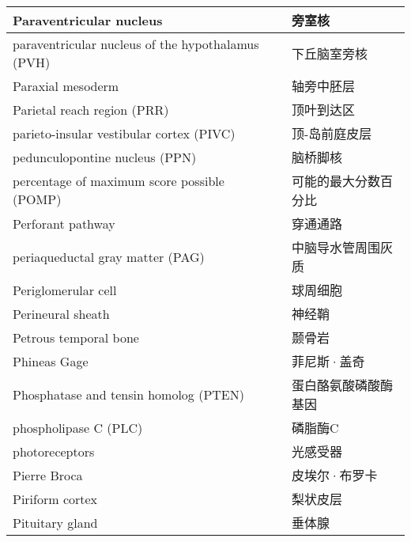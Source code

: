 \begin{longtable}{lll}
	\midrule
	Paraventricular nucleus     && 旁室核   \\
	
	\midrule
	paraventricular nucleus of the hypothalamus (PVH)    && 下丘脑室旁核   \\
	
	\midrule
	Paraxial mesoderm     && 轴旁中胚层   \\
	
	\midrule
	Parietal reach region (PRR)     && 顶叶到达区   \\
	
	\midrule
	parieto-insular vestibular cortex (PIVC)     && 顶-岛前庭皮层   \\
	
	\midrule
	pedunculopontine nucleus (PPN)     && 脑桥脚核   \\
	
	\midrule
	percentage of maximum score possible (POMP)     && 可能的最大分数百分比   \\
	
	\midrule
	Perforant pathway     && 穿通通路   \\
	
	\midrule
	periaqueductal gray matter (PAG)    && 中脑导水管周围灰质   \\
	
	\midrule
	Periglomerular cell     && 球周细胞   \\
	
	\midrule
	Perineural sheath     && 神经鞘   \\
	
	\midrule
	Petrous temporal bone     && 颞骨岩   \\
	
	\midrule
	Phineas Gage     && 菲尼斯·盖奇   \\
	
	\midrule
	Phosphatase and tensin homolog (PTEN)    && 蛋白酪氨酸磷酸酶基因   \\
	
	\midrule
	phospholipase C (PLC)     && 磷脂酶C   \\
	
	\midrule
	photoreceptors     && 光感受器   \\
	
	\midrule
	Pierre Broca     && 皮埃尔·布罗卡   \\
	
	\midrule
	Piriform cortex     && 梨状皮层   \\
	
	\midrule
	Pituitary gland     && 垂体腺   \\
	

\end{longtable}
